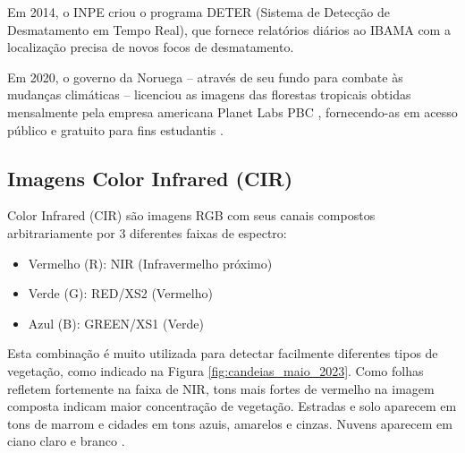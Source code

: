 \documentclass[11pt]{article}
\begin{document}


Em 2014, o INPE criou o programa DETER (Sistema de Detecção de Desmatamento em Tempo Real), que fornece relatórios diários ao IBAMA com a localização precisa de novos focos de desmatamento.

Em 2020, o governo da Noruega -- através de seu fundo para combate às mudanças climáticas -- licenciou as imagens das florestas tropicais obtidas mensalmente pela empresa americana Planet Labs PBC \cite{noruega:2020}, fornecendo-as em acesso público e gratuito para fins estudantis \cite{planet:2020}.



\subsection{Imagens Color Infrared (CIR)}

Color Infrared (CIR) são imagens RGB com seus canais compostos arbitrariamente por 3 diferentes faixas de espectro:

\begin{itemize}
	\item Vermelho (R): NIR (Infravermelho próximo)
	\item Verde (G): RED/XS2 (Vermelho)
	\item Azul (B): GREEN/XS1 (Verde)
\end{itemize}

Esta combinação é muito utilizada para detectar facilmente diferentes tipos de vegetação, como indicado na Figura \ref{fig:candeias_maio_2023}. Como folhas refletem fortemente na faixa de NIR, tons mais fortes de vermelho na imagem composta indicam maior concentração de vegetação. Estradas e solo aparecem em tons de marrom e cidades em tons azuis, amarelos e cinzas. Nuvens aparecem em ciano claro e branco \cite{eos:cir:2023}.
\end{document}
